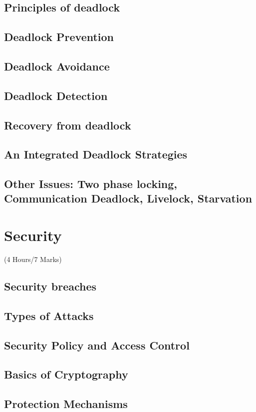 \documentclass[12pt]{article}
\begin{document}
\subsection{Principles of deadlock}
\subsection{Deadlock Prevention}
\subsection{Deadlock Avoidance}
\subsection{Deadlock Detection}
\subsection{Recovery from deadlock}
\subsection{An Integrated Deadlock Strategies}
\subsection{Other Issues: Two phase locking, Communication Deadlock, Livelock, Starvation}

\pagebreak
\section{Security}
\begin{center}(4 Hours/7 Marks)\end{center}
\subsection{Security breaches}
\subsection{Types of Attacks}
\subsection{Security Policy and Access Control}
\subsection{Basics of Cryptography}
\subsection{Protection Mechanisms}
\end{document}
